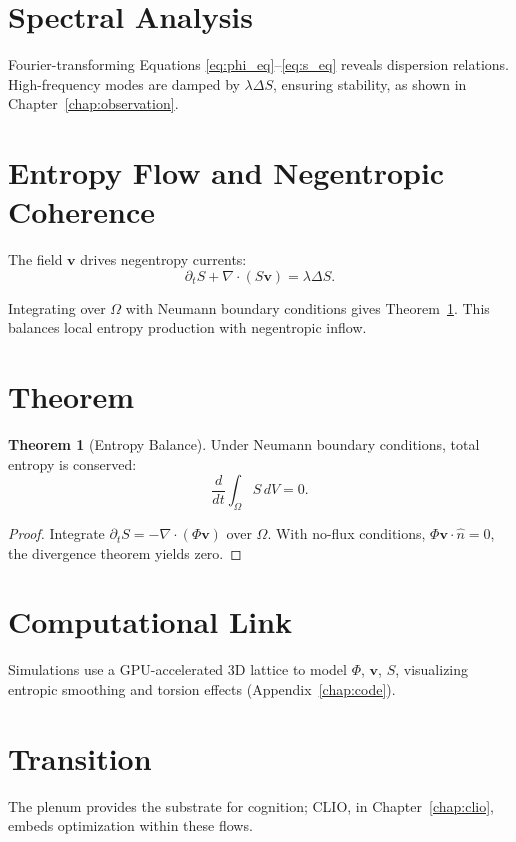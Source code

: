 \documentclass[12pt]{book}
\theoremstyle{definition}
\newtheorem{theorem}{Theorem}[chapter]
\begin{document}
\section{Spectral Analysis}
Fourier-transforming Equations \eqref{eq:phi_eq}–\eqref{eq:s_eq} reveals dispersion relations. High-frequency modes are damped by \(\lambda \Delta S\), ensuring stability, as shown in Chapter~\ref{chap:observation}.

\section{Entropy Flow and Negentropic Coherence}
The field \(\mathbf{v}\) drives negentropy currents:
\begin{equation}
\partial_t S + \nabla \cdot (S \mathbf{v}) = \lambda \Delta S.
\end{equation}

Integrating over \(\Omega\) with Neumann boundary conditions gives Theorem~\ref{thm:entropy_balance}. This balances local entropy production with negentropic inflow.

\section{Theorem}
\begin{theorem}[Entropy Balance]
\label{thm:entropy_balance}
Under Neumann boundary conditions, total entropy is conserved:
\begin{equation}
\frac{d}{dt}\int_\Omega S \, dV = 0.
\end{equation}
\end{theorem}

\begin{proof}
Integrate \(\partial_t S = -\nabla \cdot (\Phi \mathbf{v})\) over \(\Omega\). With no-flux conditions, \(\Phi \mathbf{v} \cdot \hat{n} = 0\), the divergence theorem yields zero.
\end{proof}

\section{Computational Link}
Simulations use a GPU-accelerated 3D lattice to model \(\Phi\), \(\mathbf{v}\), \(S\), visualizing entropic smoothing and torsion effects (Appendix~\ref{chap:code}).

\section{Transition}
The plenum provides the substrate for cognition; CLIO, in Chapter~\ref{chap:clio}, embeds optimization within these flows.
\end{document}
